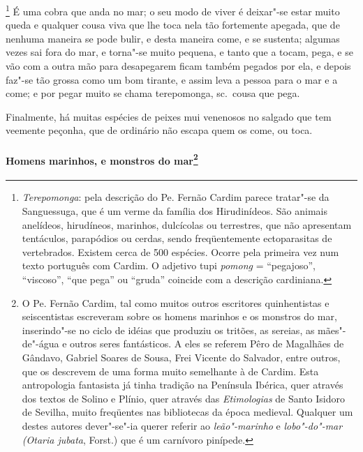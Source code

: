 \footnote{ \textit{Terepomonga}: pela descrição
do Pe. Fernão Cardim parece tratar"-se da Sanguessuga, que é um verme da
família dos Hirudinídeos. São animais anelídeos, hirudíneos, marinhos,
dulcícolas ou terrestres, que não apresentam tentáculos, parapódios ou
cerdas, sendo freqüentemente ectoparasitas de vertebrados. Existem
cerca de 500 espécies. Ocorre pela primeira vez num texto português com
Cardim. O adjetivo tupi \textit{pomong} = ``pegajoso'', ``viscoso'', ``que
pega'' ou ``gruda'' coincide com a descrição cardiniana.} É uma
cobra que anda no mar; o seu modo de viver é deixar"-se estar muito
queda e qualquer cousa viva que lhe toca nela tão fortemente apegada,
que de nenhuma maneira se pode bulir, e desta maneira come, e se
sustenta; algumas vezes sai fora do mar, e torna"-se muito pequena, e
tanto que a tocam, pega, e se vão com a outra mão para desapegarem
ficam também pegados por ela, e depois faz"-se tão grossa como um bom
tirante, e assim leva a pessoa para o mar e a come; e por pegar muito
se chama terepomonga, sc.~cousa que pega. 

 Finalmente, há muitas espécies de peixes mui venenosos no salgado que
tem veemente peçonha, que de ordinário não escapa quem os come, ou toca.

\paragraph[Homens marinhos, e monstros do mar]{Homens marinhos, 
e monstros do mar\protect\footnote{ O Pe. Fernão
Cardim, tal como muitos outros escritores quinhentistas e seiscentistas
escreveram sobre os homens marinhos e os monstros do mar, inserindo"-se
no ciclo de idéias que produziu os tritões, as sereias, as mães"-de"-água
e outros seres fantásticos. A eles se referem Pêro de Magalhães de Gândavo,
Gabriel Soares de Sousa, Frei Vicente do Salvador, entre outros, que os
descrevem de uma forma muito semelhante à de Cardim. Esta antropologia
fantasista já tinha tradição na Península Ibérica, quer através dos
textos de Solino e Plínio, quer através das \textit{Etimologias} de
Santo Isidoro de Sevilha, muito freqüentes nas bibliotecas da época
medieval. Qualquer um destes autores dever"-se"-ia querer referir ao
\textit{leão"-marinho} e \textit{lobo"-do"-mar (Otaria jubata}, Forst.)
que é um carnívoro pinípede.}}

